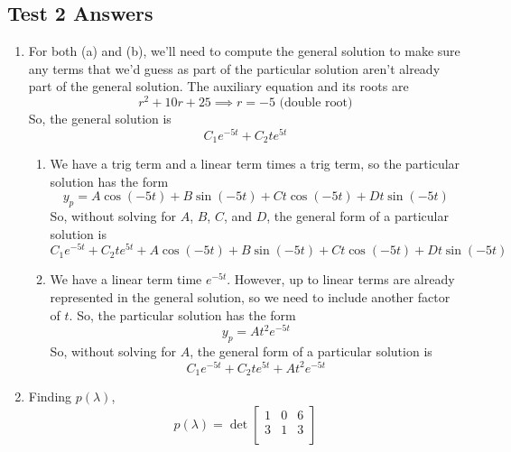 \subsection{Test 2 Answers}
\begin{enumerate}[label=\arabic*.]
	\item
		For both (a) and (b), we'll need to compute the general solution to make sure any terms that we'd guess as part of the particular solution aren't already part of the general solution. The auxiliary equation and its roots are
		\begin{equation*}
			r^2 + 10r + 25 \implies r = -5 \text{ (double root)}
		\end{equation*}
		So, the general solution is
		\begin{equation*}
			C_1e^{-5t} + C_2te^{5t}
		\end{equation*}
		\begin{enumerate}[label=(\alph*)]
			\item
				We have a trig term and a linear term times a trig term, so the particular solution has the form
				\begin{equation*}
					y_p = A\cos{(-5t)} + B\sin{(-5t)} + Ct\cos{(-5t)} + Dt\sin{(-5t)}
				\end{equation*}
				So, without solving for $A$, $B$, $C$, and $D$, the general form of a particular solution is
				\begin{equation*}
					C_1e^{-5t} + C_2te^{5t} + A\cos{(-5t)} + B\sin{(-5t)} + Ct\cos{(-5t)} + Dt\sin{(-5t)}
				\end{equation*}
			\item
				We have a linear term time $e^{-5t}$. However, up to linear terms are already represented in the general solution, so we need to include another factor of $t$. So, the particular solution has the form
				\begin{equation*}
					y_p = At^2e^{-5t}
				\end{equation*}
				So, without solving for $A$, the general form of a particular solution is
				\begin{equation*}
					C_1e^{-5t} + C_2te^{5t} + At^2e^{-5t}
				\end{equation*}
		\end{enumerate}
	\item
		Finding $p(\lambda)$,
		\begin{equation*}
			p(\lambda) = \det\begin{bmatrix}
				1 & 0 & 6 \\
				3 & 1 & 3 \\

\end{bmatrix}
\end{equation*}
\end{enumerate}
